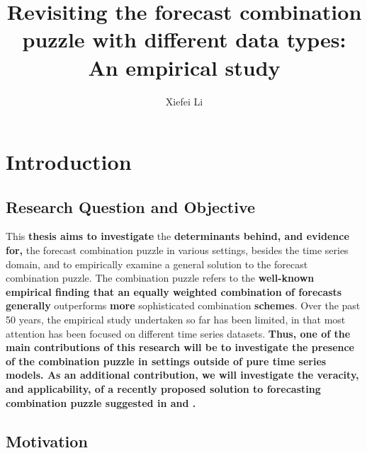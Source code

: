 \documentclass{monashthesis}
\author{Xiefei Li}
\title{Revisiting the forecast combination puzzle with different data types: An empirical study}
\begin{document}

\titlepage

{\sf\tighttoc\doublespacing}

\clearpage{}\setcounter{page}{1}

\hypertarget{introduction}{%
\chapter{Introduction}\label{introduction}}

\hypertarget{research-question-and-objective}{%
\section{Research Question and Objective}\label{research-question-and-objective}}

This \textbf{thesis aims to investigate} the \textbf{determinants behind, and evidence for,} the forecast combination puzzle in various settings, besides the time series domain, and to empirically examine a general solution to the forecast combination puzzle. The combination puzzle refers to the \textbf{well-known empirical finding that an equally weighted combination of forecasts generally} outperforms \textbf{more} sophisticated combination \textbf{schemes}. Over the past 50 years, the empirical study undertaken so far has been limited, in that most attention has been focused on different time series datasets. \textbf{Thus, one of the main contributions of this research will be to investigate the presence of the combination puzzle in settings outside of pure time series models. As an additional contribution, we will investigate the veracity, and applicability, of a recently proposed solution to forecasting combination puzzle suggested in \textcite{ZMFP22} and \textcite{FZMP23}.}

\hypertarget{motivation}{%
\section{Motivation}\label{motivation}}
\end{document}
